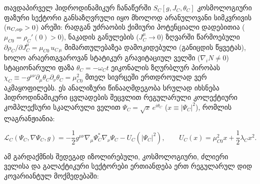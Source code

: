 \documentclass[11pt,a4paper]{article}
\begin{document}
თავდაპირველ ჰიდროდინამიკურ ჩანაწერში $S_C[g, J_C, \theta_C]$ კოსმოლოგიური ფაზური სექტორი განსაზღვრული იყო მხოლოდ არანულოვანი სიმკვრივის ($n_{C,{\rm op}} > 0$) არეში: რადგან უძრაობის ქიმიური პოტენციალი დადებითია ($\mu_{C0} = \rho_C'(0) > 0$), ნაკადის განულების ($J_C^\mu \to 0$) ზღვარში წარმოებული $\partial\rho_C/\partial J_C^\mu = \mu_{C0}\,u_{C\,\mu}$ მიმართულებაზეა დამოკიდებული (განიცდის წყვეტას), ხოლო არაერთგვაროვან სტატიკურ გრავიტაციულ ველში ($\nabla_i N \neq 0$) სტაციონარული ფაზა $\theta_C = -\omega_C t$ ეიკონალის ზღურბლურ პირობას $\chi_C \equiv -g^{\mu\nu}\partial_\mu\theta_C\partial_\nu\theta_C = \mu_{C0}^2$ მთელ სივრცეში ერთდროულად ვერ აკმაყოფილებს. ეს ანალიზური წინააღმდეგობა სრულად იხსნება ჰიდროდინამიკური ცვლადების შეცვლით რეგულარული კოლექტიური კომპლექსური სკალარული ველით $\Psi_C = \sqrt{x}\,e^{i\theta_C}$ ($x \equiv |\Psi_C|^2$), რომლის ლაგრანჟიანია:

\[
\mathcal{L}_C(\Psi_C,\nabla\Psi_C,g) = -\frac{1}{2}g^{\mu\nu}\nabla_\mu\Psi_C^*\nabla_\nu\Psi_C - U_C(|\Psi_C|^2), \qquad U_C(x) = \mu_{C0}^2 x + \frac{1}{2}\lambda_C x^2.
\]

ამ გარდაქმნის შედეგად იზოლირებული, კოსმოლოგიური, ძლიერი ველისა და გალაქტიკური სექტორები ერთიანდება ერთ რეგულარულ დიდ კოვარიანტულ მოქმედებაში:
\end{document}
